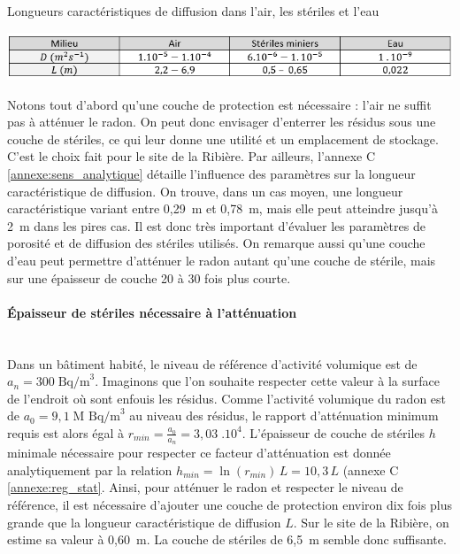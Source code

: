 \documentclass{article}
\begin{document}
\begin{table}[H]
    \centering
    \caption{Longueurs caractéristiques de diffusion dans l'air, les stériles et l'eau}
    \includegraphics[width = \linewidth]{III_C_2.png}
    \label{tab:longueur_diffusion}
\end{table}

Notons tout d’abord qu’une couche de protection est nécessaire : l’air ne suffit pas à atténuer le radon. On peut donc envisager d’enterrer les résidus sous une couche de stériles, ce qui leur donne une utilité et un emplacement de stockage. C'est le choix fait pour le site de la Ribière. Par ailleurs, l'annexe C \ref{annexe:sens_analytique} détaille l'influence des paramètres sur la longueur caractéristique de diffusion. On trouve, dans un cas moyen, une longueur caractéristique variant entre 0,29~m et 0,78~m, mais elle peut atteindre jusqu'à 2~m dans les pires cas. Il est donc très important d'évaluer les paramètres de porosité et de diffusion des stériles utilisés. On remarque aussi qu’une couche d’eau peut permettre d’atténuer le radon autant qu’une couche de stérile, mais sur une épaisseur de couche 20 à 30 fois plus courte.

\paragraph{Épaisseur de stériles nécessaire à l'atténuation \\ \\}
Dans un bâtiment habité, le niveau de référence d’activité volumique est de $a_n=300 \; \text{Bq/m}^3$. Imaginons que l’on souhaite respecter cette valeur à la surface de l’endroit où sont enfouis les résidus. Comme l'activité volumique du radon est de $a_0=9,1 \; \text{M Bq/m}^3$ au niveau des résidus, le rapport d’atténuation minimum requis est alors égal à $r_{min}=\frac{a_0}{a_n} =3,03 \; .10^4$. L’épaisseur de couche de stériles $h$ minimale nécessaire pour respecter ce facteur d’atténuation est donnée analytiquement par la relation $h_{min}=\ln(r_{min}) \,L =10,3 \,L $ (annexe C \ref{annexe:reg_stat}. Ainsi, pour atténuer le radon et respecter le niveau de référence, il est nécessaire d’ajouter une couche de protection environ dix fois plus grande que la longueur caractéristique de diffusion $L$. Sur le site de la Ribière, on estime sa valeur à 0,60~m. La couche de stériles de 6,5~m semble donc suffisante.
\end{document}
